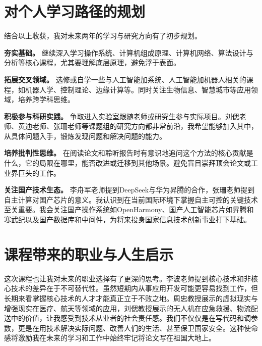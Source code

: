 \section{对个人学习路径的规划}

结合以上收获，我对未来两年的学习与研究方向有了初步规划。

\textbf{夯实基础。} 继续深入学习操作系统、计算机组成原理、计算机网络、算法设计与分析等核心课程，尤其要理解底层原理，避免浮于表面。

\textbf{拓展交叉领域。} 选修或自学一些与人工智能加系统、人工智能加机器人相关的课程，如机器人学、控制理论、边缘计算等。同时关注生物信息、智慧城市等应用领域，培养跨学科思维。

\textbf{积极参与科研实践。} 争取进入实验室跟随老师或研究生参与实际项目。刘偲老师、黄迪老师、张珊老师等课题组的研究方向都非常前沿，我希望能够加入其中，从具体问题入手，锻炼发现问题和解决问题的能力。

\textbf{培养批判性思维。} 在阅读论文和聆听报告时有意识地追问这个方法的核心贡献是什么，它的局限在哪里，能否改进或迁移到其他场景。避免盲目崇拜顶会论文或工业界巨头的工作。

\textbf{关注国产技术生态。} 李舟军老师提到DeepSeek与华为昇腾的合作，张珊老师提到自主计算对国产芯片的意义。我认识到在当前国际环境下掌握自主可控的关键技术至关重要。我会关注国产操作系统如OpenHarmony、国产人工智能芯片如昇腾和寒武纪以及国产数据库和中间件，为将来投身国家信息技术创新事业打下基础。

\section{课程带来的职业与人生启示}

这次课程也让我对未来的职业选择有了更深的思考。李波老师提到核心技术和非核心技术的差异在于不可替代性。虽然短期内从事应用开发可能更容易找到工作，但长期来看掌握核心技术的人才才能真正立于不败之地。周忠教授展示的虚拟现实与增强现实在医疗、航天等领域的应用，刘偲教授展示的无人机在应急救援、物流配送中的价值，让我感受到技术从业者的社会责任感。我们不仅仅是在写代码和调参数，更是在用技术解决实际问题、改善人们的生活、甚至保卫国家安全。这种使命感将激励我在未来的学习和工作中始终牢记将论文写在祖国大地上。